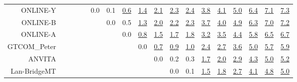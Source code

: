 \documentclass[11pt]{article}
\begin{document}
\begin{sidewaystable}
\begin{center}
{\begin{tabular}{rccccccccccccccccc}
ONLINE-Y &  &  &  &  & \cellcolor{red!0} 0.0 & \cellcolor{red!0} 0.1 & \cellcolor{red!70} \underline{0.6} & \cellcolor{red!70} \underline{1.4} & \cellcolor{red!70} \underline{2.1} & \cellcolor{red!70} \underline{2.3} & \cellcolor{red!70} \underline{2.4} & \cellcolor{red!70} \underline{3.8} & \cellcolor{red!70} \underline{4.1} & \cellcolor{red!70} \underline{5.0} & \cellcolor{red!70} \underline{6.4} & \cellcolor{red!70} \underline{7.1} & \cellcolor{red!70} \underline{7.3}\\ 
ONLINE-B &  &  &  &  &  & \cellcolor{red!0} 0.0 & \cellcolor{red!70} 0.5 & \cellcolor{red!70} \underline{1.3} & \cellcolor{red!70} \underline{2.0} & \cellcolor{red!70} \underline{2.2} & \cellcolor{red!70} \underline{2.3} & \cellcolor{red!70} \underline{3.7} & \cellcolor{red!70} \underline{4.0} & \cellcolor{red!70} \underline{4.9} & \cellcolor{red!70} \underline{6.3} & \cellcolor{red!70} \underline{7.0} & \cellcolor{red!70} \underline{7.2}\\ 
ONLINE-A &  &  &  &  &  &  & \cellcolor{red!0} 0.0 & \cellcolor{red!70} \underline{0.8} & \cellcolor{red!70} \underline{1.5} & \cellcolor{red!70} \underline{1.7} & \cellcolor{red!70} \underline{1.8} & \cellcolor{red!70} \underline{3.2} & \cellcolor{red!70} \underline{3.5} & \cellcolor{red!70} \underline{4.4} & \cellcolor{red!70} \underline{5.8} & \cellcolor{red!70} \underline{6.5} & \cellcolor{red!70} \underline{6.7}\\ 
GTCOM\_Peter &  &  &  &  &  &  &  & \cellcolor{red!0} 0.0 & \cellcolor{red!70} \underline{0.7} & \cellcolor{red!70} \underline{0.9} & \cellcolor{red!70} \underline{1.0} & \cellcolor{red!70} \underline{2.4} & \cellcolor{red!70} \underline{2.7} & \cellcolor{red!70} \underline{3.6} & \cellcolor{red!70} \underline{5.0} & \cellcolor{red!70} \underline{5.7} & \cellcolor{red!70} \underline{5.9}\\ 
ANVITA &  &  &  &  &  &  &  &  & \cellcolor{red!0} 0.0 & \cellcolor{red!0} 0.2 & \cellcolor{red!10} 0.3 & \cellcolor{red!70} \underline{1.7} & \cellcolor{red!70} \underline{2.0} & \cellcolor{red!70} \underline{2.9} & \cellcolor{red!70} \underline{4.3} & \cellcolor{red!70} \underline{5.0} & \cellcolor{red!70} \underline{5.2}\\ 
Lan-BridgeMT &  &  &  &  &  &  &  &  &  & \cellcolor{red!0} 0.0 & \cellcolor{red!0} 0.1 & \cellcolor{red!70} \underline{1.5} & \cellcolor{red!70} \underline{1.8} & \cellcolor{red!70} \underline{2.7} & \cellcolor{red!70} \underline{4.1} & \cellcolor{red!70} \underline{4.8} & \cellcolor{red!70} \underline{5.0}\\ 

\end{tabular}}
\end{center}
\end{sidewaystable}
\end{document}
